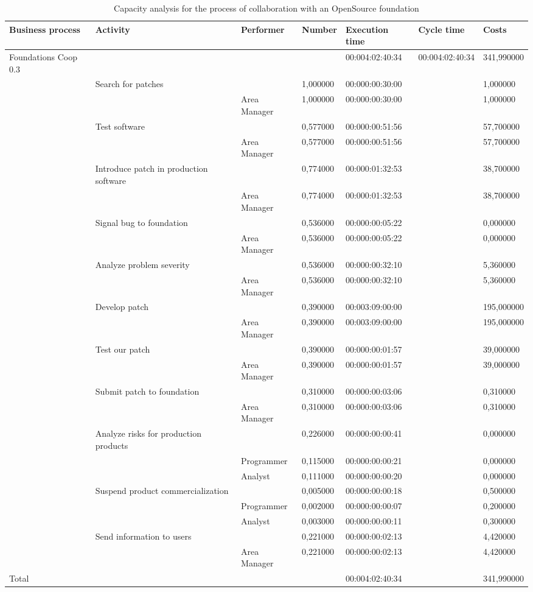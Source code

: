 \begin{landscape}
\centering
\begin{table}
{\tiny
\begin{tabular}{|l|l|l|l|l|l|l|}
Business process&Activity&Performer&Number&Execution time&Cycle
time&Costs\\
\hline
Foundations Coop 0.3&&&&00:004:02:40:34&00:004:02:40:34&341,990000\\
\hline
&Search for patches &&1,000000&00:000:00:30:00&&1,000000\\
\hline
&&Area Manager &1,000000&00:000:00:30:00&&1,000000\\
\hline
&Test software &&0,577000&00:000:00:51:56&&57,700000\\
\hline
&&Area Manager &0,577000&00:000:00:51:56&&57,700000\\
\hline
&Introduce patch in production software &&0,774000&00:000:01:32:53&&38,700000\\
\hline
&&Area Manager &0,774000&00:000:01:32:53&&38,700000\\
\hline
&Signal bug to foundation &&0,536000&00:000:00:05:22&&0,000000\\
\hline
&&Area Manager &0,536000&00:000:00:05:22&&0,000000\\
\hline
&Analyze problem severity &&0,536000&00:000:00:32:10&&5,360000\\
\hline
&&Area Manager &0,536000&00:000:00:32:10&&5,360000\\
\hline
&Develop patch &&0,390000&00:003:09:00:00&&195,000000\\
\hline
&&Area Manager &0,390000&00:003:09:00:00&&195,000000\\
\hline
&Test our patch &&0,390000&00:000:00:01:57&&39,000000\\
\hline
&&Area Manager &0,390000&00:000:00:01:57&&39,000000\\
\hline
&Submit patch to foundation &&0,310000&00:000:00:03:06&&0,310000\\
\hline
&&Area Manager &0,310000&00:000:00:03:06&&0,310000\\
\hline
&Analyze risks for production products &&0,226000&00:000:00:00:41&&0,000000\\
\hline
&&Programmer &0,115000&00:000:00:00:21&&0,000000\\
\hline
&&Analyst &0,111000&00:000:00:00:20&&0,000000\\
\hline
&Suspend product commercialization &&0,005000&00:000:00:00:18&&0,500000\\
\hline
&&Programmer &0,002000&00:000:00:00:07&&0,200000\\
\hline
&&Analyst &0,003000&00:000:00:00:11&&0,300000\\
\hline
&Send information to users &&0,221000&00:000:00:02:13&&4,420000\\
\hline
&&Area Manager &0,221000&00:000:00:02:13&&4,420000\\
\hline
Total&&&&00:004:02:40:34&&341,990000\\
\hline
\end{tabular}
}
\caption{Capacity analysis for the process of collaboration with an
OpenSource foundation} 
\label{2tab:coop}
\end{table}
\end{landscape}
